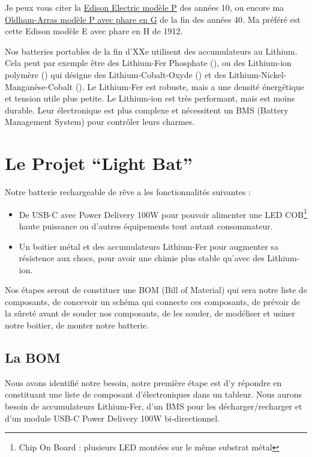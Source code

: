 \documentclass[a4paper,11pt]{article}
\newcommand{\LiFePoFour}[0]{\ce{LiFePO_4}}
\newcommand{\LiCoOtwo}[0]{\ce{LiCoO_2}}
\begin{document}
\begin{blogmain}
Je peux vous citer la \href{https://americanhistory.si.edu/collections/object/nmah_872013}{Edison Electric modèle P} des années 10, ou encore ma \href{https://collection.sciencemuseumgroup.org.uk/objects/co8654012/miners-lamp}{Oldham-Arras modèle P avec phare en G} de la fin des années 40.
Ma préféré est cette Edison modèle E avec phare en H de 1912.

Nos batteries portables de la fin d'XXe utilisent des accumulateurs au Lithium. Cela peut par exemple être des Lithium-Fer Phosphate (\LiFePoFour), ou des Lithium-ion polymère () qui désigne des Lithium-Cobalt-Oxyde (\LiCoOtwo) et des Lithium-Nickel-Manganèse-Cobalt (). Le Lithium-Fer est robuste, mais a une densité énergétique et tension utile plus petite. Le Lithium-ion est très performant, mais est moins durable.
Leur électronique est plus complexe et nécessitent un BMS (Battery Management System) pour contrôler leurs charmes.

\section{Le Projet \enquote{Light Bat}}
Notre batterie rechargeable de rêve a les fonctionnalités suivantes :
\begin{itemize}
  \item De USB-C avec Power Delivery 100W pour pouvoir alimenter une LED COB\footnote{Chip On Board : plusieurs LED montées sur le même substrat métal} haute puissance ou d'autres équipements tout autant consommateur.
  \item Un boitier métal et des accumulateurs Lithium-Fer pour augmenter sa résistence aux chocs, pour avoir une chimie plus stable qu'avec des Lithium-ion.
\end{itemize}

Nos étapes seront de constituer une BOM (Bill of Material) qui sera notre liste de composants, de concevoir un schéma qui connecte ces composants, de prévoir de la sûreté avant de souder nos composants, de les souder, de modéliser et usiner notre boitier, de monter notre batterie.

\newpage
\subsection{La BOM}
Nous avons identifié notre besoin, notre première étape est d'y répondre en constituant une liste de composant d'électroniques dans un tableur.
Nous aurons besoin de accumulateurs Lithium-Fer, d'un BMS pour les décharger/recharger et d'un module USB-C Power Delivery 100W bi-directionnel.


\end{blogmain}
\end{document}
